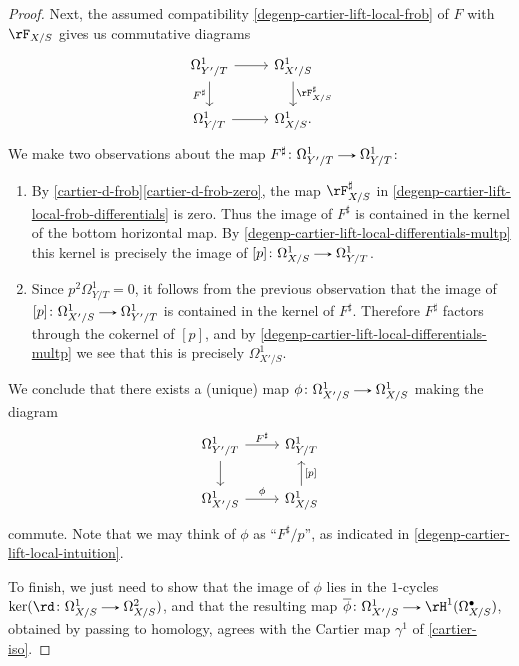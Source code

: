 \begin{proposition}
\begin{proof}
    Next, the assumed compatibility \cref{degenp-cartier-lift-local-frob} of $F$ with $\rF_{X/S}$ gives us commutative diagrams
    \begin{equation}
      \label{degenp-cartier-lift-local-frob-differentials}
      \begin{tikzcd}
        \Omega^1_{Y'/T} \ar[r] \ar[d, "F^\sharp", swap] &
        \Omega^1_{X'/S} \ar[d, "\rF_{X/S}^\sharp"] \\
        \Omega^1_{Y/T} \ar[r]  &
        \Omega^1_{X/S}.
      \end{tikzcd}
    \end{equation}
    We make two observations about the map $F^\sharp \c \Omega^1_{Y'/T} \to \Omega^1_{Y/T}$:
    \begin{enumerate}
    \item By \cref{cartier-d-frob}\cref{cartier-d-frob-zero}, the map $\rF_{X/S}^\sharp$ in \cref{degenp-cartier-lift-local-frob-differentials} is zero. Thus the image of $F^\sharp$ is contained in the kernel of the bottom horizontal map. By \cref{degenp-cartier-lift-local-differentials-multp} this kernel is precisely the image of $[p] \c \Omega^1_{X/S} \to \Omega^1_{Y/T}$.
    \item Since $p^2 \Omega^1_{Y/T} = 0$, it follows from the previous observation that the image of $[p] \c \Omega^1_{X'/S} \to \Omega^1_{Y'/T}$ is contained in the kernel of $F^\sharp$. Therefore $F^\sharp$ factors through the cokernel of $[p]$, and by \cref{degenp-cartier-lift-local-differentials-multp} we see that this is precisely $\Omega^1_{X'/S}$.
    \end{enumerate}
    We conclude that there exists a (unique) map $\phi \c \Omega^1_{X'/S} \to \Omega^1_{X/S}$ making the diagram
    \[
      \begin{tikzcd}
        \Omega^1_{Y'/T} \ar[r, "F^\sharp"] \ar[d] &
        \Omega^1_{Y/T}  \\
        \Omega^1_{X'/S} \ar[r, "\phi"]  &
        \Omega^1_{X/S} \ar[u, "{[p]}", swap]
      \end{tikzcd}
    \]
    commute. Note that we may think of $\phi$ as ``$F^\sharp/p$'', as indicated in \cref{degenp-cartier-lift-local-intuition}.

    To finish, we just need to show that the image of $\phi$ lies in the $1$-cycles $\ker(\rd \c \Omega^1_{X/S} \to \Omega^2_{X/S})$, and that the resulting map $\o\phi \c \Omega^1_{X'/S} \to \rH^1(\Omega^\bullet_{X/S})$, obtained by passing to homology, agrees with the Cartier map $\gamma^1$ of \cref{cartier-iso}.


\end{proof}
\end{proposition}
